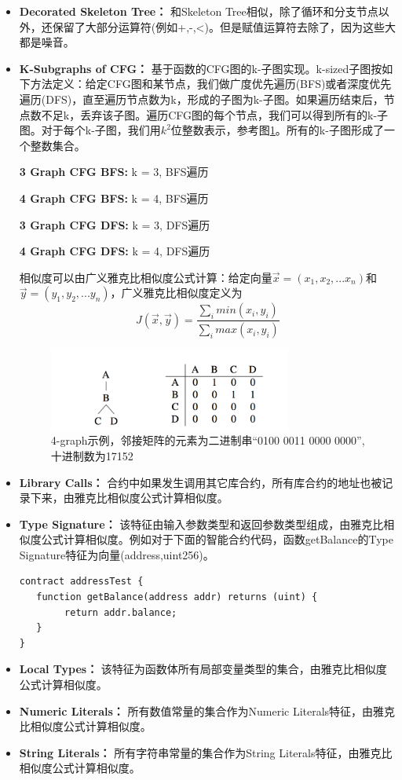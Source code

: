 \begin{itemize}
	\item \textbf{Decorated Skeleton Tree：} 和Skeleton Tree相似，除了循环和分支节点以外，还保留了大部分运算符(例如+,-,<)。但是赋值运算符去除了，因为这些大都是噪音。
	\item \textbf{K-Subgraphs of CFG：} 基于函数的CFG图的k-子图实现。k-sized子图按如下方法定义：给定CFG图和某节点，我们做广度优先遍历(BFS)或者深度优先遍历(DFS)，直至遍历节点数为k，形成的子图为k-子图。如果遍历结束后，节点数不足k，丢弃该子图。遍历CFG图的每个节点，我们可以得到所有的k-子图。对于每个k-子图，我们用$k^{2}$位整数表示，参考图\ref{fig:graph-ex}。所有的k-子图形成了一个整数集合。
	
	\textbf{3 Graph CFG BFS:} k = 3, BFS遍历
	
	\textbf{4 Graph CFG BFS:} k = 4, BFS遍历
	
	\textbf{3 Graph CFG DFS:} k = 3, DFS遍历
	
	\textbf{4 Graph CFG DFS:} k = 4, DFS遍历
	
	相似度可以由广义雅克比相似度公式计算：给定向量$\vec{x}=(x_{1},x_{2},...x_{n})$和$\vec{y}=(y_{1},y_{2},...y_{n})$，广义雅克比相似度定义为
	\begin{equation}
	J(\vec{x},\vec{y})=\frac{\sum_imin(x_{i},y_{i})}{\sum_imax(x_{i},y_{i})}
	\end{equation}
	
	
	\begin{figure}[h]
	\centering
	\includegraphics[width=8cm]{./figs/graph-matrix.png}
	\caption{4-graph示例，邻接矩阵的元素为二进制串“0100 0011 0000 0000”, 十进制数为17152}
	\label{fig:graph-ex}
	\end{figure}


	\item \textbf{Library Calls：} 合约中如果发生调用其它库合约，所有库合约的地址也被记录下来，由雅克比相似度公式计算相似度。
	\item \textbf{Type Signature：} 该特征由输入参数类型和返回参数类型组成，由雅克比相似度公式计算相似度。例如对于下面的智能合约代码，函数getBalance的Type Signature特征为向量(address,uint256)。
	
	\begin{lstlisting}[frame=single]
contract addressTest {
   function getBalance(address addr) returns (uint) {
   		return addr.balance;
   }
}
	\end{lstlisting}
	
	\item \textbf{Local Types：} 该特征为函数体所有局部变量类型的集合，由雅克比相似度公式计算相似度。
	\item \textbf{Numeric Literals：} 所有数值常量的集合作为Numeric Literals特征，由雅克比相似度公式计算相似度。
	\item \textbf{String Literals：} 所有字符串常量的集合作为String Literals特征，由雅克比相似度公式计算相似度。
\end{itemize}

